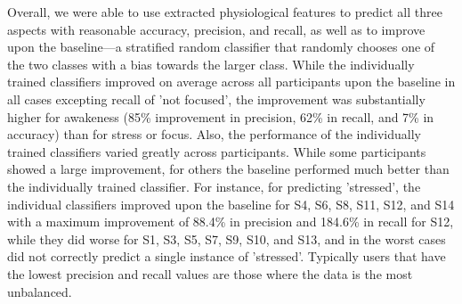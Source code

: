 Overall, we were able to use extracted physiological features to
predict all three aspects with reasonable accuracy, precision, and
recall, as well as to improve upon the baseline---a stratified random
classifier that randomly chooses one of the two classes with a bias
towards the larger class. While the individually trained classifiers
improved on average across all participants upon the baseline in all
cases excepting recall of 'not focused', the improvement was
substantially higher for awakeness (85\% improvement in precision,
62\% in recall, and 7\% in accuracy) than for stress or focus. Also,
the performance of the individually trained classifiers varied greatly
across participants. While some participants showed a large
improvement, for others the baseline performed much better than the
individually trained classifier. For instance, for predicting
'stressed', the individual classifiers improved upon the baseline for
S4, S6, S8, S11, S12, and S14 with a maximum improvement of 88.4\% in
precision and 184.6\% in recall for S12, while they did worse for S1,
S3, S5, S7, S9, S10, and S13, and in the worst cases did not correctly
predict a single instance of 'stressed'. Typically users that have the
lowest precision and recall values are those where the data is the
most unbalanced.\\[-0.1cm]
%
